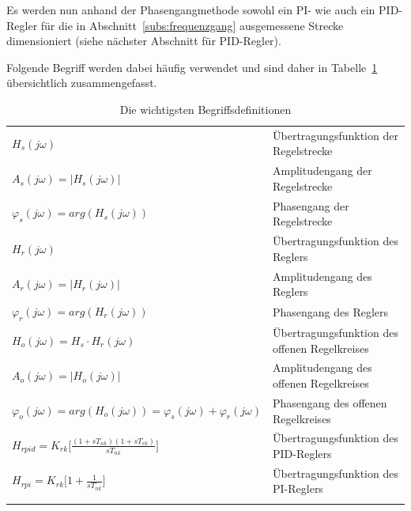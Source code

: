 Es  werden nun  anhand  der  Phasengangmethode sowohl  ein  PI-  wie auch  ein
PID-Regler f\"ur die in Abschnitt~\ref{subs:frequenzgang} ausgemessene Strecke
dimensioniert (siehe n\"achster Abschnitt f\"ur PID-Regler).

Folgende  Begriff   werden  dabei  h\"aufig   verwendet  und  sind   daher  in
Tabelle~\ref{tab:terms} \"ubersichtlich zusammengefasst.

\begin{longtable}{lp{60mm}}
    \toprule
    \endhead
    \endfoot
    \endlastfoot


    $H_s(j\omega)                                                                   $ &  \"Ubertragungsfunktion der Regelstrecke \\
    $A_s(j\omega)=|H_s(j\omega)|                                                    $ &  Amplitudengang der Regelstrecke \\
    $\varphi_s(j\omega)=arg(H_s(j\omega))                                           $ &  Phasengang der Regelstrecke \\
    $H_r(j\omega)                                                                   $ &  \"Ubertragungsfunktion des Reglers \\
    $A_r(j\omega)=|H_r(j\omega)|                                                    $ &  Amplitudengang des Reglers \\
    $\varphi_r(j\omega)=arg(H_r(j\omega))                                           $ &  Phasengang des Reglers \\
    $H_o(j\omega)=H_s \cdot H_r(j\omega)                                            $ &  \"Ubertragungsfunktion des offenen Regelkreises \\
    $A_o(j\omega)=|H_o(j\omega)|                                                    $ &  Amplitudengang des offenen Regelkreises \\
    $\varphi_o(j\omega)=arg(H_o(j\omega))=\varphi_s(j\omega)+\varphi_r(j\omega)     $ &  Phasengang des offenen Regelkreises \\
    $H_{rpid}= K_{rk}\Big[ \frac{(1+sT_{nk})(1+sT_{vk})}{sT_{nk}}\Big]              $ & \"Ubertragungsfunktion des PID-Reglers \\
    $H_{rpi} = K_{rk}\Big[ 1 + \frac{1}{sT_{nk}} \Big]                              $ & \"Ubertragungsfunktion des PI-Reglers \\

    \bottomrule
    \caption{Die wichtigsten Begriffsdefinitionen}
    \label{tab:terms}
\end{longtable}


